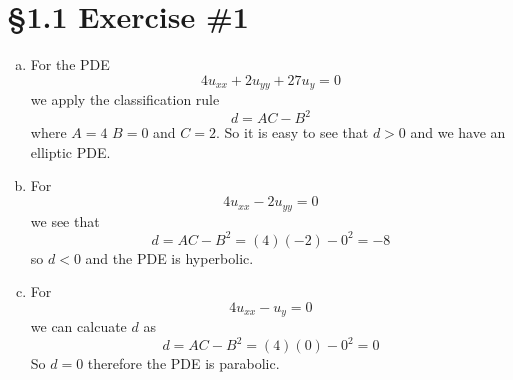 \documentclass[11pt]{article}
\numberwithin{equation}{section}
\begin{document}


\section{\S 1.1 Exercise \#1}
\begin{enumerate}[(a)]
\item
For the PDE
$$4u_{xx}+2u_{yy} + 27u_y = 0$$
we apply the classification rule 
$$d = AC -B^2$$
where $A=4$ $B=0$ and $C=2$. So it is easy to see that $d>0$ and we have an elliptic PDE.

\item
For
$$4u_{xx}-2u_{yy} = 0$$
we see that 
$$d = AC - B^2 = (4)(-2) - 0^2 = -8$$
so $d<0$ and the PDE is hyperbolic.

\item
For 
$$4u_{xx}-u_{y} = 0$$
we can calcuate $d$ as
$$d = AC - B^2 = (4)(0) - 0^2 = 0$$
So $d=0$ therefore the PDE is parabolic.
\end{enumerate}
\end{document}
